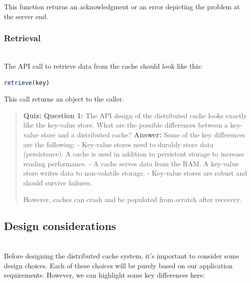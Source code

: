 This function returns an acknowledgment or an error depicting the problem at the server end.

\subsubsection{Retrieval}\label{BZKUGbhuKmK_hr2Qsab20}
\\
The API call to retrieve data from the cache should look like this:

\begin{lstlisting}[language=JavaScript]
retrieve(key)
\end{lstlisting}

\begin{table}[htbp]
\centering
\small
{}
\end{table}

This call returns an object to the caller.

\begin{quote}
\textbf{Quiz:}
\textbf{Question 1:} The API design of the distributed cache looks exactly like the key-value store. What are the possible differences between a key-value store and a distributed cache?
\textbf{Answer:} Some of the key differences are the following: - Key-value stores need to durably store data (persistence). A cache is used in addition to persistent storage to increase reading performance. - A cache serves data from the RAM. A key-value store writes data to non-volatile storage. - Key-value stores are robust and should survive failures.

However, caches can crash and be populated from scratch after recovery.
\end{quote}

\subsection{Design considerations}\label{0H4nfElXUHpzu20mRlcXD}
\\
Before designing the distributed cache system, it's important to consider some design choices. Each of these choices will be purely based on our application requirements. However, we can highlight some key differences here:

